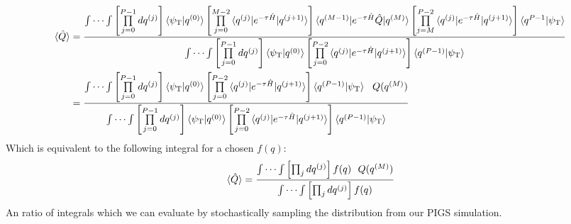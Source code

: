 \documentclass[12pt,letterpaper,oneside,final,titlepage]{article}               %
\numberwithin{equation}{section} %
\newcommand{\psiT}{\psi_{\textrm{T}}}
\newcommand{\eTH}{e^{-\tau\hat{H}}}
\begin{document}
\begin{align}
    \braket{\hat{Q}} 
        &=\frac{\int\cdots\int\left[\prod\limits_{j=0}^{P-1}dq^{(j)}\right]
                \braket{\psiT|q^{(0)}}
                \left[\prod\limits_{j=0}^{M-2}\braket{q^{(j)}|\eTH|q^{(j+1)}}\right]
                \braket{q^{(M-1)}|\eTH\hat{Q}|q^{(M)}}
                \left[\prod\limits_{j=M}^{P-2}\braket{q^{(j)}|\eTH|q^{(j+1)}}\right]
                \braket{q^{P-1}|\psiT}
                }
               {\int\cdots\int\left[\prod\limits_{j=0}^{P-1}dq^{(j)}\right]
                \braket{\psiT|q^{(0)}}
                \left[\prod\limits_{j=0}^{P-2}\braket{q^{(j)}|\eTH|q^{(j+1)}}\right]
                \braket{q^{(P-1)}|\psiT}
                }
    \\  &=\frac{\int\cdots\int\left[\prod\limits_{j=0}^{P-1}dq^{(j)}\right]
                \braket{\psiT|q^{(0)}}
                \left[\prod\limits_{j=0}^{P-2}\braket{q^{(j)}|\eTH|q^{(j+1)}}\right]
                \braket{q^{(P-1)}|\psiT}
                \,\,\,\,Q(q^{(M)})
                }
               {\int\cdots\int\left[\prod\limits_{j=0}^{P-1}dq^{(j)}\right]
                \braket{\psiT|q^{(0)}}
                \left[\prod\limits_{j=0}^{P-2}\braket{q^{(j)}|\eTH|q^{(j+1)}}\right]
                \braket{q^{(P-1)}|\psiT}
                }
\end{align}
Which is equivalent to the following integral for a chosen $f(q)$:
\begin{equation}
\braket{\hat{Q}} 
                =\frac{\int\cdots\int\left[\prod_{j}dq^{(j)}\right]
                f(q)
                \,\,\,\,Q(q^{(M)})
                }
               {\int\cdots\int\left[\prod_{j}dq^{(j)}\right]
                f(q)
                } 
\end{equation}           
An ratio of integrals which we can evaluate by stochastically sampling the distribution from our PIGS simulation.
\end{document}
